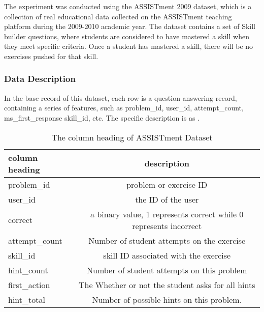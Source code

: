 The experiment was conducted using the ASSISTment 2009 dataset, which is a collection of real educational data collected on the ASSISTment teaching platform during the 2009-2010 academic year. The dataset contains a set of Skill builder questions, where students are considered to have mastered a skill when they meet specific criteria. Once a student has mastered a skill, there will be no exercises pushed for that skill.


\subsubsection{Data Description}

In the base record of this dataset, each row is a question answering record, containing a series of features, such as problem\_id, user\_id, attempt\_count, ms\_first\_response skill\_id, etc. The specific description is as \tblname{\ref{tbl:ch3-assist2009-heading}}.

\begin{table}[htbp!]
    \centering
    \caption{The column heading of ASSISTment Dataset}\label{tbl:ch3-assist2009-heading}
    \begin{tabular}{lc}
        \toprule
        column heading & description                                                       \\
        \midrule
        problem\_id    & problem or exercise ID                                            \\
        user\_id       & the ID of the user                                                \\
        correct        & a binary value, 1 represents correct while 0 represents incorrect \\
        attempt\_count & Number of student attempts on the exercise                        \\
        skill\_id      & skill ID associated with the exercise                             \\
        hint\_count    & Number of student attempts on this problem                        \\
        first\_action  & The Whether or not the student asks for all hints                 \\
        hint\_total    & Number of possible hints on this problem.                         \\
        \bottomrule
    \end{tabular}
\end{table}

